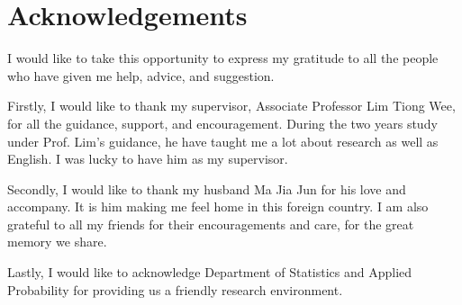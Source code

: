 \chapter{Acknowledgements}

I would like to take this opportunity to express my gratitude to all the people who have given me help, advice, and suggestion. 

Firstly, I would like to thank my supervisor, Associate Professor Lim Tiong Wee, for all the guidance, support, and encouragement. During the two years study under Prof. Lim's guidance, he have taught me a lot about research as well as English. I was lucky to have him as my supervisor. 

Secondly, I would like to thank my husband Ma Jia Jun for his love and accompany. It is him making me feel home in this foreign country. I am also grateful to all my friends for their encouragements and care, for the great memory we share. 

Lastly, I would like to acknowledge Department of Statistics and Applied Probability for providing us a friendly research environment. 


